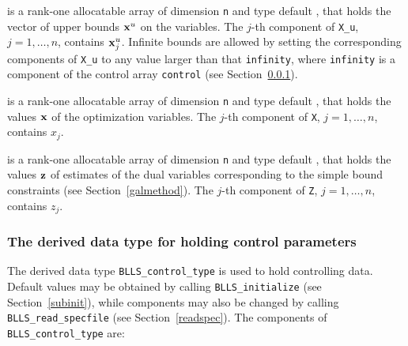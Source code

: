 \documentclass{galahad}
\newcommand{\packagename}{BLLS}
\begin{document}
\begin{description}
 is a rank-one allocatable array of dimension {\tt n} and type
default \realdp, that holds
the vector of upper bounds ${\mathbf{x}}^{u}$ on the variables.
The $j$-th component of {\tt X\_u}, $j = 1, \ldots , n$,
contains ${\mathbf{x}}_{j}^{u}$.
Infinite bounds are allowed by setting the corresponding
components of {\tt X\_u} to any value larger than that {\tt infinity},
where {\tt infinity} is a component of the control array {\tt control}
(see Section~\ref{typecontrol}).

 is a rank-one allocatable array of dimension {\tt n} and type
default \realdp,
that holds the values ${\mathbf{x}}$ of the optimization variables.
The $j$-th component of {\tt X}, $j = 1,  \ldots , n$, contains $x_{j}$.

 is a rank-one allocatable array of dimension {\tt n} and type default
\realdp, that holds
the values ${\mathbf{z}}$ of estimates  of the dual variables
corresponding to the simple bound constraints (see Section~\ref{galmethod}).
The $j$-th component of {\tt Z}, $j = 1,  \ldots ,  n$, contains $z_{j}$.

\end{description}


\subsubsection{The derived data type for holding control
 parameters}\label{typecontrol}
The derived data type
{\tt \packagename\_control\_type}
is used to hold controlling data. Default values may be obtained by calling
{\tt \packagename\_initialize}
(see Section~\ref{subinit}),
while components may also be changed by calling
{\tt \packagename\_read\-\_specfile}
(see Section~\ref{readspec}).
The components of
{\tt \packagename\_control\_type}
are:
\end{document}
